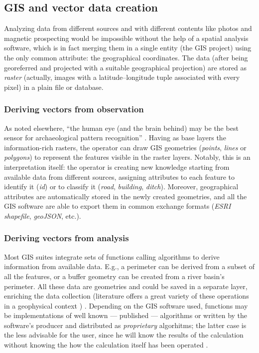         \subsection{GIS and vector data creation}
            Analyzing data from different sources and with different contents like photos and magnetic prospecting would be impossible without the help of a spatial analysis software, which is in fact merging them in a single entity (the GIS project) using the only common attribute: the geographical coordinates. The data (after being georeferred and projected with a suitable geographical projection) are stored as \emph{raster} (actually, images with a latitude--longitude tuple associated with every pixel) in a plain file or database.\\

            \subsubsection{Deriving vectors from observation}
                As noted elsewhere, ``the human eye (and the brain behind) may be the best sensor for archaeological pattern recognition'' \cite[p.~164]{becker}. Having as base layers the information-rich rasters, the operator can draw GIS geometries (\emph{points}, \emph{lines} or \emph{polygons}) to represent the features visible in the raster layers. Notably, this is an interpretation itself: the operator is creating new knowledge starting from available data from different sources, assigning attributes to each feature to identify it (\emph{id}) or to classify it (\emph{road}, \emph{building}, \emph{ditch}). Moreover, geographical attributes are automatically stored in the newly created geometries, and all the GIS software are able to export them in common exchange formats (\emph{ESRI shapefile}, \emph{geoJSON}, etc.).

            \subsubsection{Deriving vectors from analysis}
                Most GIS suites integrate sets of functions calling algorithms to derive information from available data. E.g., a perimeter can be derived from a subset of all the features, or a buffer geometry can be created from a river basin's perimeter. All these data are geometries and could be saved in a separate layer, enriching the data collection (literature offers a great variety of these operations in a geophysical context \cite[p.~325]{remote-ciminale})
                . Depending on the GIS software used, functions may be implementations of well known --- published --- algorithms or written by the software's producer and distributed as \emph{proprietary} algorhitms; the latter case is the less advisable for the user, since he will know the results of the calculation without knowing the how the calculation itself has been operated \cite[p.~69]{fronza-informatica}.

